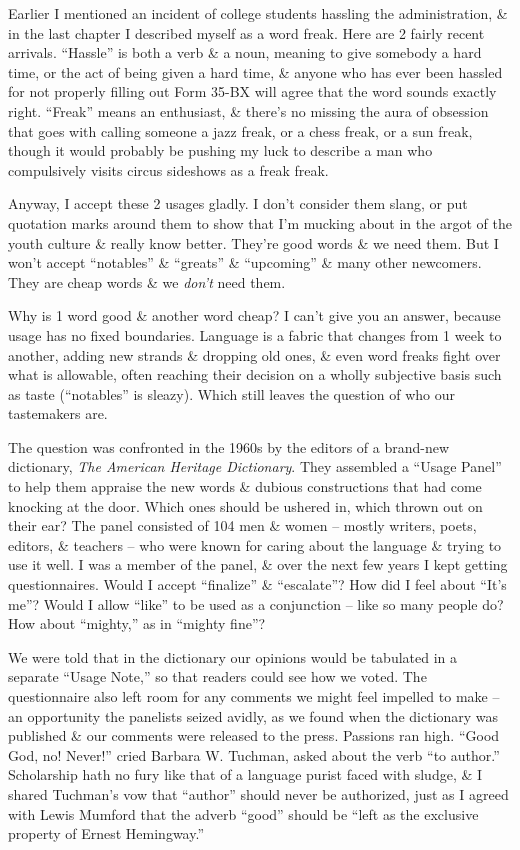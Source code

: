 \documentclass{article}
\begin{document}
Earlier I mentioned an incident of college students hassling the administration, \& in the last chapter I described myself as a word freak. Here are 2 fairly recent arrivals. ``Hassle'' is both a verb \& a noun, meaning to give somebody a hard time, or the act of being given a hard time, \& anyone who has ever been hassled for not properly filling out Form 35-BX will agree that the word sounds exactly right. ``Freak'' means an enthusiast, \& there's no missing the aura of obsession that goes with calling someone a jazz freak, or a chess freak, or a sun freak, though it would probably be pushing my luck to describe a man who compulsively visits circus sideshows as a freak freak.

Anyway, I accept these 2 usages gladly. I don't consider them slang, or put quotation marks around them to show that I'm mucking about in the argot of the youth culture \& really know better. They're good words \& we need them. But I won't accept ``notables'' \& ``greats'' \& ``upcoming'' \& many other newcomers. They are cheap words \& we \textit{don't} need them.

Why is 1 word good \& another word cheap? I can't give you an answer, because usage has no fixed boundaries. Language is a fabric that changes from 1 week to another, adding new strands \& dropping old ones, \& even word freaks fight over what is allowable, often reaching their decision on a wholly subjective basis such as taste (``notables'' is sleazy). Which still leaves the question of who our tastemakers are.

The question was confronted in the 1960s by the editors of a brand-new dictionary, \textit{The American Heritage Dictionary}. They assembled a ``Usage Panel'' to help them appraise the new words \& dubious constructions that had come knocking at the door. Which ones should be ushered in, which thrown out on their ear? The panel consisted of 104 men \& women -- mostly writers, poets, editors, \& teachers -- who were known for caring about the language \& trying to use it well. I was a member of the panel, \& over the next few years I kept getting questionnaires. Would I accept ``finalize'' \& ``escalate''? How did I feel about ``It's me''? Would I allow ``like'' to be used as a conjunction -- like so many people do? How about ``mighty,'' as in ``mighty fine''?

We were told that in the dictionary our opinions would be tabulated in a separate ``Usage Note,'' so that readers could see how we voted. The questionnaire also left room for any comments we might feel impelled to make -- an opportunity the panelists seized avidly, as we found when the dictionary was published \& our comments were released to the press. Passions ran high. ``Good God, no! Never!'' cried Barbara W. Tuchman, asked about the verb ``to author.'' Scholarship hath no fury like that of a language purist faced with sludge, \& I shared Tuchman's vow that ``author'' should never be authorized, just as I agreed with Lewis Mumford that the adverb ``good'' should be ``left as the exclusive property of Ernest Hemingway.''
\end{document}
